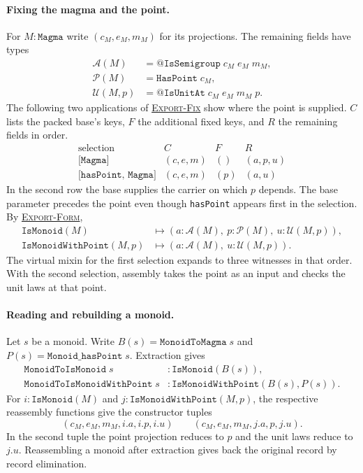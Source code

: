 \documentclass{article}
\newcommand{\ttt}[1]{\texttt{#1}}
\newcommand{\ruse}[1]{\hyperlink{rule-#1}{\textsc{#1}}}
\begin{document}
\paragraph{Fixing the magma and the point.}
For $M:\ttt{Magma}$ write $(c_M,e_M,m_M)$ for its projections. The
remaining fields have types
\[
\begin{aligned}
 \mathcal A(M)&=\ttt{@IsSemigroup}\;c_M\;e_M\;m_M,\\
 \mathcal P(M)&=\ttt{HasPoint}\;c_M,\\
 \mathcal U(M,p)&=\ttt{@IsUnitAt}\;c_M\;e_M\;m_M\;p.
\end{aligned}
\]
The following two applications of \ruse{Export-Fix} show where the
point is supplied. $C$ lists the packed base's keys, $F$ the additional
fixed keys, and $R$ the remaining fields in order.
\[
\begin{array}{llll}
 \text{selection}&C&F&R\\ \hline
 \ttt{[Magma]} &(c,e,m)&()&(a,p,u)\\
 \ttt{[hasPoint, Magma]} &(c,e,m)&(p)&(a,u)
\end{array}
\]
In the second row the base supplies the carrier on which $p$ depends.
The base parameter precedes the point even though \ttt{hasPoint}
appears first in the selection. By \ruse{Export-Form},
\[
\begin{aligned}
 \ttt{IsMonoid}(M)
   &\longmapsto (a:\mathcal A(M),\ p:\mathcal P(M),\ u:\mathcal U(M,p)),\\
 \ttt{IsMonoidWithPoint}(M,p)
   &\longmapsto (a:\mathcal A(M),\ u:\mathcal U(M,p)).
\end{aligned}
\]
The virtual mixin for the first selection expands to three witnesses
in that order. With the second selection, assembly takes the point as
an input and checks the unit laws at that point.

\paragraph{Reading and rebuilding a monoid.}
Let $s$ be a monoid. Write $B(s)=\ttt{MonoidToMagma}\;s$ and
$P(s)=\ttt{Monoid\_hasPoint}\;s$. Extraction gives
\[
\begin{aligned}
 \ttt{MonoidToIsMonoid}\;s &: \ttt{IsMonoid}(B(s)),\\
 \ttt{MonoidToIsMonoidWithPoint}\;s
     &: \ttt{IsMonoidWithPoint}(B(s),P(s)).
\end{aligned}
\]
For $i:\ttt{IsMonoid}(M)$ and $j:\ttt{IsMonoidWithPoint}(M,p)$,
the respective reassembly functions give the constructor tuples
\[
 (c_M,e_M,m_M,i.a,i.p,i.u) \qquad (c_M,e_M,m_M,j.a,p,j.u).
\]
In the second tuple the point projection reduces to $p$ and the unit
laws reduce to $j.u$. Reassembling a monoid after extraction gives back
the original record by record elimination.
\end{document}
